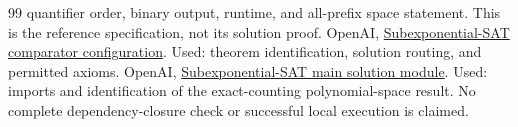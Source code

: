 \documentclass[11pt,a4paper]{article}
\numberwithin{equation}{section}
\theoremstyle{definition}
\theoremstyle{remark}
\begin{document}
\begin{thebibliography}{99}
quantifier order, binary output, runtime, and all-prefix space statement.
This is the reference specification, not its solution proof.
 OpenAI,
\href{https://github.com/openai/math/blob/7ef5c0cc5ca4b0e072b7a050fca09ab24bc6fa3a/lean/ComparatorChallenges/SubexponentialSAT.json}{Subexponential-SAT comparator configuration}.
Used: theorem identification, solution routing, and permitted axioms.
 OpenAI,
\href{https://github.com/openai/math/blob/7ef5c0cc5ca4b0e072b7a050fca09ab24bc6fa3a/lean/OAI/Algorithms/SubexponentialSAT/Main.lean}{Subexponential-SAT main solution module}.
Used: imports and identification of the exact-counting polynomial-space result.
No complete dependency-closure check or successful local execution is claimed.
\end{thebibliography}
\end{document}
